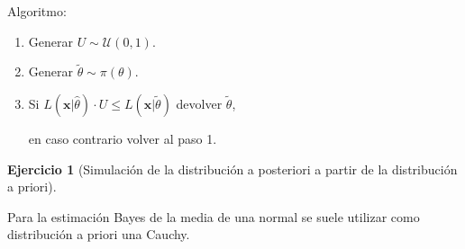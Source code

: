 \documentclass[
]{book}
\theoremstyle{break}
\theoremstyle{definition}
\theoremstyle{definition}
\theoremstyle{definition}
\newtheorem{exercise}{Ejercicio}[chapter]
\theoremstyle{definition}
\theoremstyle{remark}
\begin{document}
Algoritmo:

\begin{enumerate}
\def\labelenumi{\arabic{enumi}.}
\item
  Generar \(U \sim \mathcal{U}(0, 1)\).
\item
  Generar \(\tilde{\theta}\sim \pi (\theta )\).
\item
  Si \(L(\mathbf{x}|\hat{\theta})\cdot U \leq L(\mathbf{x}|\tilde{\theta})\) devolver \(\tilde{\theta}\),

  en caso contrario volver al paso 1.
\end{enumerate}

\begin{exercise}[Simulación de la distribución a posteriori a partir de la distribución a priori]
\protect\hypertarget{exr:post-pri-ar}{}{\label{exr:post-pri-ar} {} }
\end{exercise}

Para la estimación Bayes de la media de una normal se suele utilizar
como distribución a priori una Cauchy.
\end{document}
